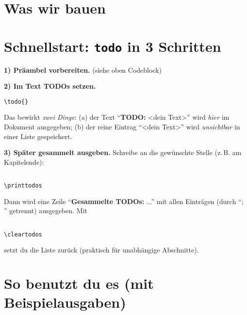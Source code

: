 \documentclass[11pt,a4paper]{book}
\newcommand{\todo}[1]{\textbf{TODO:}~#1\ExplSyntaxOn\demo_todo_add:n{#1}\ExplSyntaxOff}
\newcommand{\printtodos}{\par\medskip\textbf{Gesammelte TODOs: }\ExplSyntaxOn\seq_use:Nn \g_demo_todo_seq {; }\ExplSyntaxOff\par}
\newcommand{\cleartodos}{\ExplSyntaxOn\seq_gclear:N \g_demo_todo_seq\ExplSyntaxOff}
\begin{document}
\section{Was wir bauen}

\section{Schnellstart: \texttt{todo} in 3 Schritten}
\textbf{1) Präambel vorbereiten.} (siehe oben Codeblock)

\textbf{2) Im Text TODOs setzen.}
\begin{verbatim}
\todo{}
\end{verbatim}

Das bewirkt \emph{zwei Dinge}: (a) der Text \enquote{\textbf{TODO:} <dein Text>} wird \emph{hier} im Dokument ausgegeben; (b) der reine Eintrag \enquote{<dein Text>} wird \emph{unsichtbar} in einer Liste gespeichert.



\textbf{3) Später gesammelt ausgeben.} Schreibe an die gewünschte Stelle (z.\,B. am Kapitelende):

\begin{verbatim}

\printtodos

\end{verbatim}

Dann wird eine Zeile \enquote{\textbf{Gesammelte TODOs:} ...} mit allen Einträgen (durch \enquote{; } getrennt) ausgegeben. Mit

\begin{verbatim}

\cleartodos

\end{verbatim}

setzt du die Liste zurück (praktisch für unabhängige Abschnitte).



\section{So benutzt du es (mit Beispielausgaben)}
\end{document}
